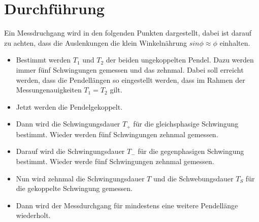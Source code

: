 \section{Durchführung}
\label{sec:Durchführung}
Ein Messdruchgang wird in den folgenden Punkten dargestellt, dabei ist
darauf zu achten, dass die Auslenkungen die klein Winkelnährung $sin\phi \approx \phi$
einhalten.
\begin{itemize}
  \item Bestimmt werden $T_1 $ und $T_2$ der beiden ungekoppelten Pendel.
  Dazu werden immer fünf Schwingungen gemessen und das zehnmal.
  Dabei soll erreicht werden, dass die Pendellängen so eingestellt werden,
  dass im Rahmen der Messungenauigkeiten $T_1 = T_2$ gilt.
  \item Jetzt werden die Pendelgekoppelt.
  \item Dann wird die Schwingungsdauer $T_+$ für die gleichsphasige Schwingung
  bestimmt. Wieder werden fünf Schwingungen zehnmal gemessen.
  \item Darauf wird die Schwingungsdauer $T_-$ für die gegenphasigen Schwingung
  bestimmt. Wieder werde fünf Schwingungen zehnmal gemessen.
  \item Nun wird zehnmal die Schwingungsdauer $T$ und die Schwebungsdauer $T_S$
  für die gekoppelte Schwingung gemessen.
  \item Dann wird der Messdurchgang für mindestens eine weitere Pendellänge
  wiederholt.
\end{itemize}
